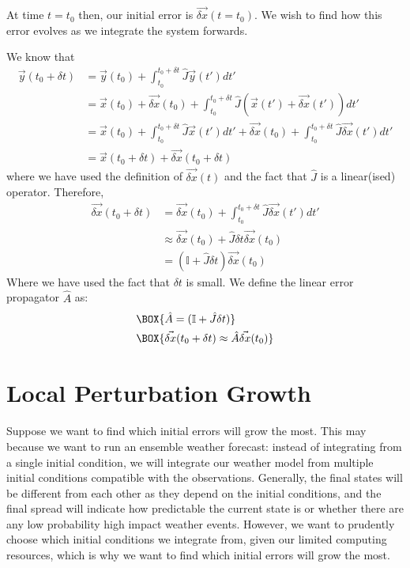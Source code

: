 At time $t=t_0$ then, our initial error is $\vec{\delta x}(t=t_0)$. We wish to find how this error evolves as we integrate the system forwards.

We know that
\begin{align*}
    \vec{y}(t_0+\delta t) & = \vec{y}(t_0) + \int_{t_0}^{t_0+\delta t} \hat{J} \vec{y}(t') dt'\\
    & = \vec{x}(t_0) + \vec{\delta x}(t_0)+ \int_{t_0}^{t_0+\delta t} \hat{J} (\vec{x}(t') + \vec{\delta x}(t')) dt'\\
    & = \vec{x}(t_0) + \int_{t_0}^{t_0+\delta t} \hat{J} \vec{x}(t') dt'+ \vec{\delta x}(t_0)+ \int_{t_0}^{t_0+\delta t} \hat{J} \vec{\delta x}(t') dt'\\
    & = \vec{x}(t_0+\delta t) + \vec{\delta x}(t_0+\delta t)
\end{align*}
where we have used the definition of $\vec{\delta x}(t)$ and the fact that $\hat{J}$ is a linear(ised) operator. Therefore, 
\begin{align*}
    \vec{\delta x}(t_0+\delta t) & = \vec{\delta x}(t_0)+ \int_{t_0}^{t_0+\delta t} \hat{J} \vec{\delta x}(t') dt'\\
    & \approx \vec{\delta x}(t_0)+ \hat{J} \delta t\vec{\delta x}(t_0)\\
    & = (\mathbb{I} + \hat{J}\delta t)\vec{\delta x}(t_0)
\end{align*}
Where we have used the fact that $\delta t$ is small. We define the linear error propagator $\hat{A}$ as:
\begin{align}
    & \BOX{\hat{A} = (\mathbb{I} + \hat{J}\delta t)}\\
    & \BOX{\vec{\delta x}(t_0+\delta t)\approx\hat{A}\vec{\delta x}(t_0)} \label{dx}
\end{align}

\section{Local Perturbation Growth}

Suppose we want to find which initial errors will grow the most. This may because we want to run an ensemble weather forecast: instead of integrating from a single initial condition, we will integrate our weather model from multiple initial conditions compatible with the observations. Generally, the final states will be different from each other as they depend on the initial conditions, and the final spread will indicate how predictable the current state is or whether there are any low probability high impact weather events. However, we want to prudently choose which initial conditions we integrate from, given our limited computing resources, which is why we want to find which initial errors will grow the most.

